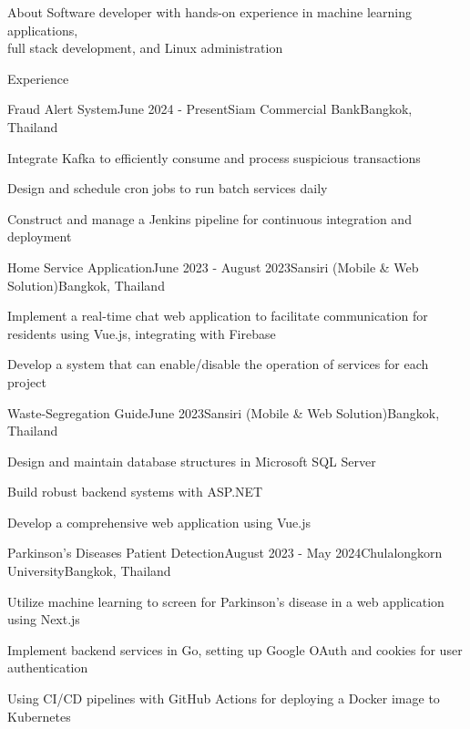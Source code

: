 \documentclass[12pt]{resume}
\begin{document}
\begin{rSection}{About}
    Software developer with hands-on experience in machine learning applications, \\
    full stack development, and Linux administration
\end{rSection}

\begin{rSection}{Experience}
    \begin{rSubsection}{Fraud Alert System}{June 2024 - Present}{Siam Commercial Bank}{Bangkok, Thailand}
        \item Integrate Kafka to efficiently consume and process suspicious transactions
        \item Design and schedule cron jobs to run batch services daily
        \item Construct and manage a Jenkins pipeline for continuous integration and deployment
    \end{rSubsection}

    \begin{rSubsection}{Home Service Application}{June 2023 - August 2023}{Sansiri (Mobile \& Web Solution)}{Bangkok, Thailand}
        \item Implement a real-time chat web application to facilitate communication for residents using Vue.js, integrating with Firebase
        \item Develop a system that can enable/disable the operation of services for each project
    \end{rSubsection}

	\begin{rSubsection}{Waste-Segregation Guide}{June 2023}{Sansiri (Mobile \& Web Solution)}{Bangkok, Thailand}
        \item Design and maintain database structures in Microsoft SQL Server
        \item Build robust backend systems with ASP.NET
        \item Develop a comprehensive web application using Vue.js
	\end{rSubsection}

	\begin{rSubsection}{Parkinson's Diseases Patient Detection}{August 2023 - May 2024}{Chulalongkorn University}{Bangkok, Thailand}
        \item Utilize machine learning to screen for Parkinson's disease in a web application using Next.js
        \item Implement backend services in Go, setting up Google OAuth and cookies for user authentication 
        \item Using CI/CD pipelines with GitHub Actions for deploying a Docker image to Kubernetes
	\end{rSubsection}

\end{rSection}
\end{document}
